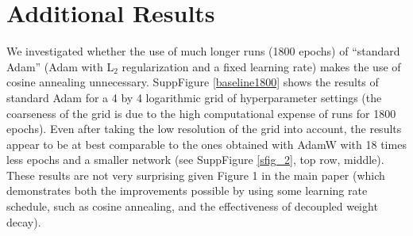 \documentclass[usenames,dvipsnames]{article} %
\begin{document}
\section{Additional Results}
\label{app:additional_results}





We investigated whether the use of much longer runs (1800 epochs) of ``standard Adam'' (Adam with L$_2$ regularization and a fixed learning rate) makes the use of cosine annealing unnecessary. SuppFigure \ref{baseline1800} shows the results of standard Adam for a 4 by 4 logarithmic grid of hyperparameter settings (the coarseness of the grid is due to the high computational expense of runs for 1800 epochs). Even after taking the low resolution of the grid into account, the results appear to be at best comparable to the ones obtained with AdamW with 18 times less epochs and a smaller network (see SuppFigure \ref{sfig_2}, top row, middle). These results are not very surprising given Figure 1 in the main paper (which demonstrates both the improvements possible by using some learning rate schedule, such as cosine annealing, and the effectiveness of decoupled weight decay).
\end{document}
